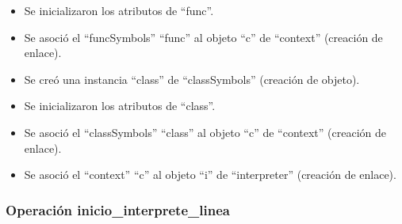 \begin{description}
\begin {itemize}
         \item Se inicializaron los atributos de ``func''.
         \item Se asoció el ``funcSymbols'' ``func'' al objeto ``c'' de ``context'' (creación de enlace).
         \item Se creó una instancia ``class'' de ``classSymbols'' (creación de objeto).
         \item Se inicializaron los atributos de ``class''.
         \item Se asoció el ``classSymbols'' ``class'' al objeto ``c'' de ``context'' (creación de enlace).
         \item Se asoció el ``context'' ``c'' al objeto ``i'' de ``interpreter'' (creación de enlace).
      \end{itemize}
	\end{description}


\subsubsection{Operación inicio\_interprete\_linea}


